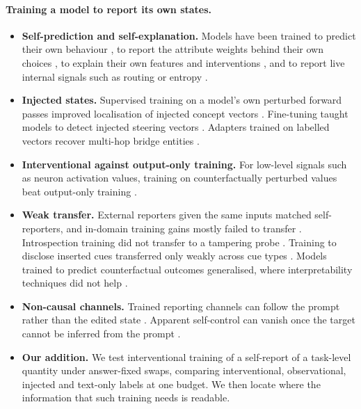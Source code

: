 \documentclass[11pt]{article}
\begin{document}
\paragraph{Training a model to report its own states.}
\begin{itemize}
\item \textbf{Self-prediction and self-explanation.} Models have been trained to predict their own behaviour \citep{binder2024looking}, to report the attribute weights behind their own choices \citep{plunkett2025selfinterpretability}, to explain their own features and interventions \citep{li2025training,guo2026introspective}, and to report live internal signals such as routing or entropy \citep{geiping2026proprioception}.
\item \textbf{Injected states.} Supervised training on a model's own perturbed forward passes improved localisation of injected concept vectors \citep{hahami2026introspection}. Fine-tuning taught models to detect injected steering vectors \citep{fonsecarivera2026steering}. Adapters trained on labelled vectors recover multi-hop bridge entities \citep{pepper2026learning}.
\item \textbf{Interventional against output-only training.} For low-level signals such as neuron activation values, training on counterfactually perturbed values beat output-only training \citep{anon2026interventional}.
\item \textbf{Weak transfer.} External reporters given the same inputs matched self-reporters, and in-domain training gains mostly failed to transfer \citep{anon2026posthoc}. Introspection training did not transfer to a tampering probe \citep{nguyen2026prefills}. Training to disclose inserted cues transferred only weakly across cue types \citep{cheah2026faithfulness}. Models trained to predict counterfactual outcomes generalised, where interpretability techniques did not help \citep{karvonen2026counterfactual}.
\item \textbf{Non-causal channels.} Trained reporting channels can follow the prompt rather than the edited state \citep{hatua2026verbalization}. Apparent self-control can vanish once the target cannot be inferred from the prompt \citep{aoki2026neurofeedback}.
\item \textbf{Our addition.} We test interventional training of a self-report of a task-level quantity under answer-fixed swaps, comparing interventional, observational, injected and text-only labels at one budget. We then locate where the information that such training needs is readable.
\end{itemize}
\end{document}
